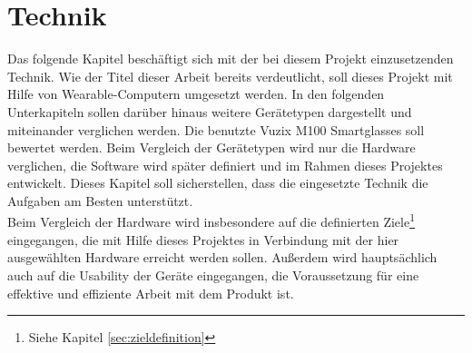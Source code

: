 \chapter{Technik}
\label{cha:technik}
Das folgende Kapitel beschäftigt sich mit der bei diesem Projekt einzusetzenden Technik. Wie der Titel dieser Arbeit bereits verdeutlicht, soll dieses Projekt mit Hilfe von Wearable-Computern umgesetzt werden. In den folgenden Unterkapiteln sollen darüber hinaus weitere Gerätetypen dargestellt und miteinander verglichen werden. Die benutzte Vuzix M100 Smartglasses soll bewertet werden. Beim Vergleich der Gerätetypen wird nur die Hardware verglichen, die Software wird später definiert und im Rahmen dieses Projektes entwickelt. Dieses Kapitel soll sicherstellen, dass die eingesetzte Technik die Aufgaben am Besten unterstützt.\\

Beim Vergleich der Hardware wird insbesondere auf die definierten Ziele\footnote{Siehe Kapitel \ref{sec:zieldefinition} } eingegangen, die mit Hilfe dieses Projektes in Verbindung mit der hier ausgewählten Hardware erreicht werden sollen. Außerdem wird hauptsächlich auch auf die Usability der Geräte eingegangen, die Voraussetzung für eine effektive und effiziente Arbeit mit dem Produkt ist. 

